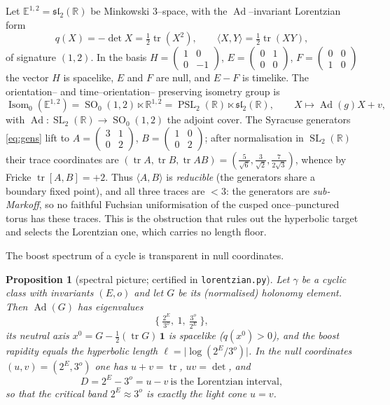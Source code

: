\documentclass[11pt,a4paper]{article}
\theoremstyle{bourbaki}
\newtheorem{prop}[thm]{Proposition}
\theoremstyle{bourbakidef}
\newcommand{\R}{\mathbb{R}}
\newcommand{\Emink}{\mathbb{E}^{1,2}}
\newcommand{\slt}{\mathfrak{sl}_2(\R)}
\DeclareMathOperator{\Ad}{Ad}
\DeclareMathOperator{\tr}{tr}
\DeclareMathOperator{\SO}{SO}
\DeclareMathOperator{\SL}{SL}
\DeclareMathOperator{\PSL}{PSL}
\DeclareMathOperator{\Isom}{Isom}
\begin{document}
Let $\Emink=\slt$ be Minkowski $3$--space, with the $\Ad$--invariant Lorentzian form
\begin{equation}\label{eq:form}
  q(X)=-\det X=\tfrac12\tr(X^2),\qquad \langle X,Y\rangle=\tfrac12\tr(XY),
\end{equation}
of signature $(1,2)$. In the basis
$H=\left(\begin{smallmatrix}1&0\\0&-1\end{smallmatrix}\right)$,
$E=\left(\begin{smallmatrix}0&1\\0&0\end{smallmatrix}\right)$,
$F=\left(\begin{smallmatrix}0&0\\1&0\end{smallmatrix}\right)$ the vector $H$ is spacelike,
$E$ and $F$ are null, and $E-F$ is timelike. The orientation-- and time--orientation--
preserving isometry group is
\[
  \Isom_0(\Emink)=\SO_0(1,2)\ltimes\R^{1,2}=\PSL_2(\R)\ltimes\slt,\qquad
  X\mapsto \Ad(g)X+v,
\]
with $\Ad:\SL_2(\R)\to\SO_0(1,2)$ the adjoint cover. The Syracuse generators
\eqref{eq:gens} lift to $A=\left(\begin{smallmatrix}3&1\\0&2\end{smallmatrix}\right)$,
$B=\left(\begin{smallmatrix}1&0\\0&2\end{smallmatrix}\right)$; after normalisation in
$\SL_2(\R)$ their trace coordinates are
$(\tr A,\tr B,\tr AB)=(\tfrac{5}{\sqrt6},\tfrac{3}{\sqrt2},\tfrac{7}{2\sqrt3})$, whence by
Fricke $\tr[A,B]=+2$. Thus $\langle A,B\rangle$ is \emph{reducible} (the generators share a
boundary fixed point), and all three traces are $<3$: the generators are \emph{sub-Markoff},
so no faithful Fuchsian uniformisation of the cusped once--punctured torus has these traces.
This is the obstruction that rules out the hyperbolic target and selects the Lorentzian one,
which carries no length floor.

The boost spectrum of a cycle is transparent in null coordinates.

\begin{prop}[spectral picture; certified in \texttt{lorentzian.py}]\label{prop:spectral}
Let $\gamma$ be a cyclic class with invariants $(E,o)$ and let $G$ be its (normalised)
holonomy element. Then $\Ad(G)$ has eigenvalues
\[
  \Big\{\ \tfrac{2^E}{3^o},\ 1,\ \tfrac{3^o}{2^E}\ \Big\},
\]
its neutral axis $x^0=G-\tfrac12(\tr G)\,\mathbf 1$ is spacelike ($q(x^0)>0$), and the boost
rapidity equals the hyperbolic length $\ell=\bigl|\log(2^E/3^o)\bigr|$. In the null
coordinates $(u,v)=(2^E,3^o)$ one has $u+v=\tr$, $uv=\det$, and
\[
  D=2^E-3^o=u-v\ \text{is the Lorentzian interval},
\]
so that the critical band $2^E\approx 3^o$ is exactly the light cone $u=v$.
\end{prop}
\end{document}
